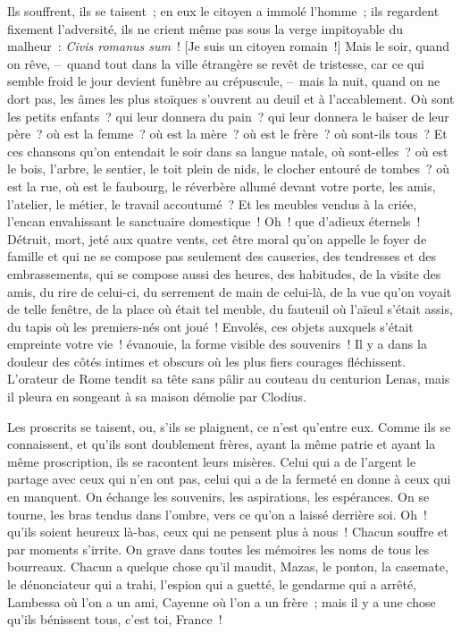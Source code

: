\documentclass[french,twoside]{book} %
\begin{document}
Ils souffrent, ils se taisent ; en eux le citoyen a immolé l’homme ; ils regardent fixement l’adversité, ils ne crient même pas sous la verge impitoyable du malheur : \emph{Civis romanus sum} ! [Je suis un citoyen romain !] Mais le soir, quand on rêve, – quand tout dans la ville étrangère se revêt de tristesse, car ce qui semble froid le jour devient funèbre au crépuscule, – mais la nuit, quand on ne dort pas, les âmes les plus stoïques s’ouvrent au deuil et à l’accablement. Où sont les petits enfants ? qui leur donnera du pain ? qui leur donnera le baiser de leur père ? où est la femme ? où est la mère ? où est le frère ? où sont-ils tous ? Et ces chansons qu’on entendait le soir dans sa langue natale, où sont-elles ? où est le bois, l’arbre, le sentier, le toit plein de nids, le clocher entouré de tombes ? où est la rue, où est le faubourg, le réverbère allumé devant votre porte, les amis, l’atelier, le métier, le travail accoutumé ? Et les meubles vendus à la criée, l’encan envahissant le sanctuaire domestique ! Oh ! que d’adieux éternels ! Détruit, mort, jeté aux quatre vents, cet être moral qu’on appelle le foyer de famille et qui ne se compose pas seulement des causeries, des tendresses et des embrassements, qui se compose aussi des heures, des habitudes, de la visite des amis, du rire de celui-ci, du serrement de main de celui-là, de la vue qu’on voyait de telle fenêtre, de la place où était tel meuble, du fauteuil où l’aïeul s’était assis, du tapis où les premiers-nés ont joué ! Envolés, ces objets auxquels s’était empreinte votre vie ! évanouie, la forme visible des souvenirs ! Il y a dans la douleur des côtés intimes et obscurs où les plus fiers courages fléchissent. L’orateur de Rome tendit sa tête sans pâlir au couteau du centurion Lenas, mais il pleura en songeant à sa maison démolie par Clodius.\par
Les proscrits se taisent, ou, s’ils se plaignent, ce n’est qu’entre eux. Comme ils se connaissent, et qu’ils sont doublement frères, ayant la même patrie et ayant la même proscription, ils se racontent leurs misères. Celui qui a de l’argent le partage avec ceux qui n’en ont pas, celui qui a de la fermeté en donne à ceux qui en manquent. On échange les souvenirs, les aspirations, les espérances. On se tourne, les bras tendus dans l’ombre, vers ce qu’on a laissé derrière soi. Oh ! qu’ils soient heureux là-bas, ceux qui ne pensent plus à nous ! Chacun souffre et par moments s’irrite. On grave dans toutes les mémoires les noms de tous les bourreaux. Chacun a quelque chose qu’il maudit, Mazas, le ponton, la casemate, le dénonciateur qui a trahi, l’espion qui a guetté, le gendarme qui a arrêté, Lambessa où l’on a un ami, Cayenne où l’on a un frère ; mais il y a une chose qu’ils bénissent tous, c’est toi, France !\par
\end{document}
